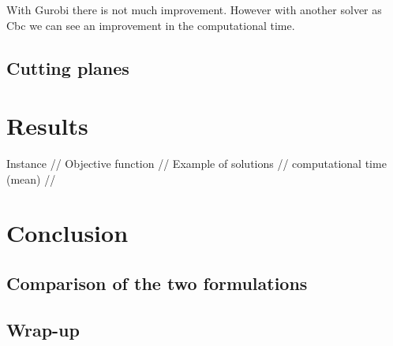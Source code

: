 \documentclass[a4paper,10pt]{article}
\begin{document}
With Gurobi there is not much improvement. However with another solver as Cbc we can see an improvement in the computational time. 

\subsection{Cutting planes}


\section{Results}

 Instance // Objective function // Example of solutions  // computational time (mean) //



\section{Conclusion}
	\subsection{Comparison of the two formulations}
	\subsection{Wrap-up}
	
\end{document}
